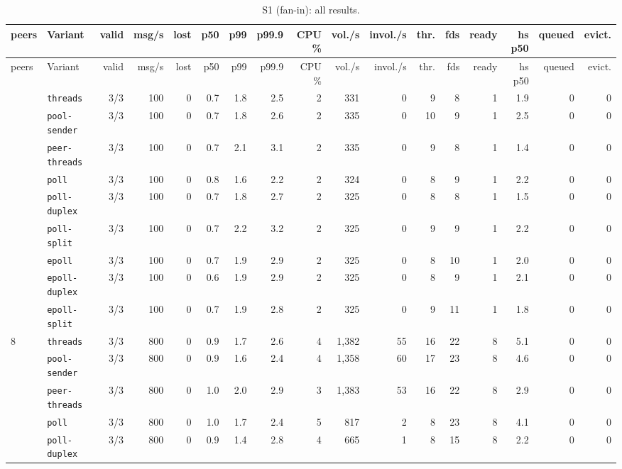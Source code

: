 \begin{longtable}{@{}llrrrrrrrrrrrrrrr@{}}
\caption{S1 (fan-in): all results.}\label{tab:full-S1}\\
\toprule
peers & Variant & valid & msg/s & lost & p50 & p99 & p99.9 & CPU \% & vol./s & invol./s & thr. & fds & ready & hs p50 & queued & evict. \\
\midrule
\endfirsthead
\toprule
peers & Variant & valid & msg/s & lost & p50 & p99 & p99.9 & CPU \% & vol./s & invol./s & thr. & fds & ready & hs p50 & queued & evict. \\
\midrule
\endhead
\bottomrule
\endfoot
1 & \texttt{threads} & 3/3 & 100 & 0 & 0.7 & 1.8 & 2.5 & 2 & 331 & 0 & 9 & 8 & 1 & 1.9 & 0 & 0 \\
 & \texttt{pool-sender} & 3/3 & 100 & 0 & 0.7 & 1.8 & 2.6 & 2 & 335 & 0 & 10 & 9 & 1 & 2.5 & 0 & 0 \\
 & \texttt{peer-threads} & 3/3 & 100 & 0 & 0.7 & 2.1 & 3.1 & 2 & 335 & 0 & 9 & 8 & 1 & 1.4 & 0 & 0 \\
 & \texttt{poll} & 3/3 & 100 & 0 & 0.8 & 1.6 & 2.2 & 2 & 324 & 0 & 8 & 9 & 1 & 2.2 & 0 & 0 \\
 & \texttt{poll-duplex} & 3/3 & 100 & 0 & 0.7 & 1.8 & 2.7 & 2 & 325 & 0 & 8 & 8 & 1 & 1.5 & 0 & 0 \\
 & \texttt{poll-split} & 3/3 & 100 & 0 & 0.7 & 2.2 & 3.2 & 2 & 325 & 0 & 9 & 9 & 1 & 2.2 & 0 & 0 \\
 & \texttt{epoll} & 3/3 & 100 & 0 & 0.7 & 1.9 & 2.9 & 2 & 325 & 0 & 8 & 10 & 1 & 2.0 & 0 & 0 \\
 & \texttt{epoll-duplex} & 3/3 & 100 & 0 & 0.6 & 1.9 & 2.9 & 2 & 325 & 0 & 8 & 9 & 1 & 2.1 & 0 & 0 \\
 & \texttt{epoll-split} & 3/3 & 100 & 0 & 0.7 & 1.9 & 2.8 & 2 & 325 & 0 & 9 & 11 & 1 & 1.8 & 0 & 0 \\
\midrule
8 & \texttt{threads} & 3/3 & 800 & 0 & 0.9 & 1.7 & 2.6 & 4 & 1{,}382 & 55 & 16 & 22 & 8 & 5.1 & 0 & 0 \\
 & \texttt{pool-sender} & 3/3 & 800 & 0 & 0.9 & 1.6 & 2.4 & 4 & 1{,}358 & 60 & 17 & 23 & 8 & 4.6 & 0 & 0 \\
 & \texttt{peer-threads} & 3/3 & 800 & 0 & 1.0 & 2.0 & 2.9 & 3 & 1{,}383 & 53 & 16 & 22 & 8 & 2.9 & 0 & 0 \\
 & \texttt{poll} & 3/3 & 800 & 0 & 1.0 & 1.7 & 2.4 & 5 & 817 & 2 & 8 & 23 & 8 & 4.1 & 0 & 0 \\
 & \texttt{poll-duplex} & 3/3 & 800 & 0 & 0.9 & 1.4 & 2.8 & 4 & 665 & 1 & 8 & 15 & 8 & 2.2 & 0 & 0 \\

\end{longtable}

